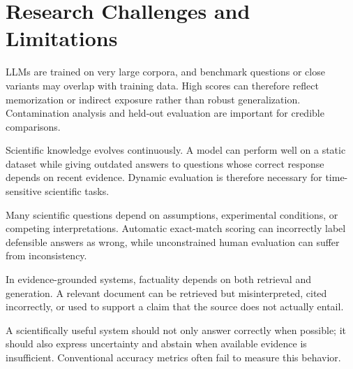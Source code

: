 \documentclass[10pt,a4paper]{article}
\begin{document}
\FloatBarrier




\section{Research Challenges and Limitations}\label{sec:limitations}

\begin{description}[
  leftmargin= 3.2cm,
  labelwidth=2.85cm,
  labelsep=0.3cm,
  itemsep=0.25\baselineskip,
  topsep=0.15\baselineskip,
  parsep=0pt,
  partopsep=0pt,
  style=multiline,
  font=\normalfont\bfseries
]

\item[Data contamination:]
LLMs are trained on very large corpora, and benchmark questions or close variants may overlap with training data. High scores can therefore reflect memorization or indirect exposure rather than robust generalization. Contamination analysis and held-out evaluation are important for credible comparisons.

\item[Static benchmarks:]
Scientific knowledge evolves continuously. A model can perform well on a static dataset while giving outdated answers to questions whose correct response depends on recent evidence. Dynamic evaluation is therefore necessary for time-sensitive scientific tasks.

\item[Ambiguity and underspecification:]
Many scientific questions depend on assumptions, experimental conditions, or competing interpretations. Automatic exact-match scoring can incorrectly label defensible answers as wrong, while unconstrained human evaluation can suffer from inconsistency.

\item[Retrieval and citation errors:]
In evidence-grounded systems, factuality depends on both retrieval and generation. A relevant document can be retrieved but misinterpreted, cited incorrectly, or used to support a claim that the source does not actually entail.

\item[Calibration and abstention:]
A scientifically useful system should not only answer correctly when possible; it should also express uncertainty and abstain when available evidence is insufficient. Conventional accuracy metrics often fail to measure this behavior.

\end{description}
\end{document}
